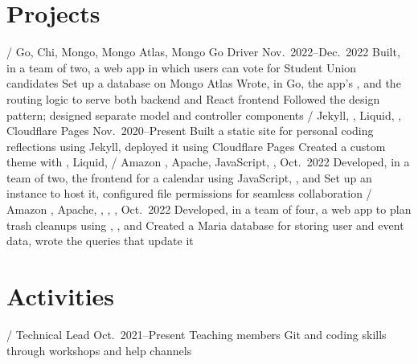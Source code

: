 \section{Projects}
\begin{doutline}
     / Go, Chi, Mongo, Mongo Atlas, Mongo Go Driver
    \hfill Nov.\ 2022--Dec.\ 2022
        \2 Built, in a team of two, a web app in which users can vote for Student Union candidates
            \3 Set up a database on Mongo Atlas
            \3 Wrote, in Go, the app's  , and the routing logic to serve both backend and React frontend
            \3 Followed the  design pattern; designed separate model and controller components
     / Jekyll, , Liquid, , Cloudflare Pages
    \hfill Nov.\ 2020--Present
        \2 Built a static site for personal coding reflections using Jekyll, deployed it using Cloudflare Pages
            \3 Created a custom theme with , Liquid, 
     / Amazon , Apache, JavaScript, , 
    \hfill Oct.\ 2022
        \2 Developed, in a team of two, the frontend for a calendar using JavaScript, , and 
        \2 Set up an  instance to host it, configured file permissions for seamless collaboration
    \1[Trashfree] / Amazon , Apache, , , , 
    \hfill Oct.\ 2022
        \2 Developed, in a team of four, a web app to plan trash cleanups using , , and 
        \2 Created a Maria database for storing user and event data, wrote the  queries that update it
\end{doutline}

\section{Activities}
\begin{doutline}
     / Technical Lead
    \hfill Oct.\ 2021--Present
        \2 Teaching members Git and coding skills through workshops and help channels
\end{doutline}
